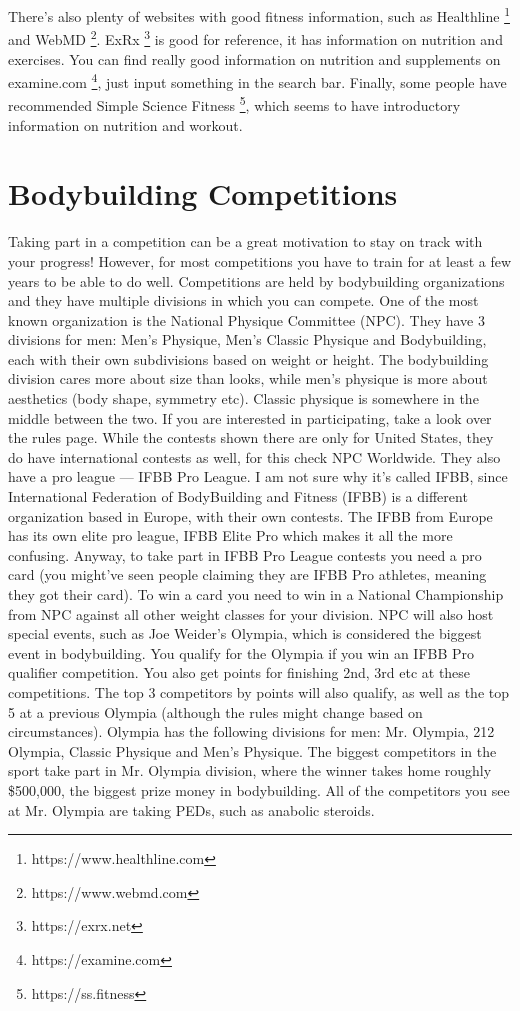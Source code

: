 \documentclass[openany, 12pt]{book}
\begin{document}
        There's also plenty of websites with good fitness information, such as Healthline
        \footnote{https://www.healthline.com} and WebMD
        \footnote{https://www.webmd.com}. ExRx
        \footnote{https://exrx.net} is good for reference, it has information on nutrition and exercises. You can find really good information on nutrition and supplements
        on examine.com
        \footnote{https://examine.com}, just input something in the search bar. Finally, some people have recommended Simple Science Fitness
        \footnote{https://ss.fitness}, which seems to have introductory information on nutrition and workout.

        \section{Bodybuilding Competitions}

        Taking part in a competition can be a great motivation to stay on track with your progress! However, for most competitions you have to train for at least a few years to be able to do well.
        Competitions are held by bodybuilding organizations and they have multiple divisions in which you can compete. One of the most known organization is the National Physique Committee
        (NPC). They have 3 divisions for men: Men's Physique, Men's Classic Physique and Bodybuilding, each with their own subdivisions
        based on weight or height. The bodybuilding division cares more about size than looks, while men's physique is more about aesthetics (body shape, symmetry etc). Classic physique is somewhere
        in the middle between the two. If you are interested in participating, take a look over the rules page. While the contests shown there are only for United States,
        they do have international contests as well, for this check NPC Worldwide. They also have a pro league --- IFBB Pro League. I am not sure why it's called IFBB, since
        International Federation of BodyBuilding and Fitness (IFBB) is a different organization based in Europe, with their own contests. The IFBB from Europe has its own elite pro league,
        IFBB Elite Pro which makes it all the more confusing. Anyway, to take part in IFBB Pro League contests you need a pro card (you might've seen
        people claiming they are IFBB Pro athletes, meaning they got their card). To win a card you need to win in a National Championship from NPC against all other weight classes for your division.
        NPC will also host special events, such as Joe Weider's Olympia, which is considered the biggest event in bodybuilding. You qualify for the Olympia if you win an IFBB Pro qualifier competition.
        You also get points for finishing 2nd, 3rd etc at these competitions. The top 3 competitors by points will also qualify, as well as the top 5 at a previous Olympia (although the rules
        might change based on circumstances). Olympia has the following divisions for men: Mr. Olympia, 212 Olympia, Classic Physique and Men's Physique. The biggest competitors in the sport take
        part in Mr. Olympia division, where the winner takes home roughly \$500,000, the biggest prize money in bodybuilding. All of the competitors you see at Mr. Olympia are taking PEDs, such
        as anabolic steroids.
\end{document}
